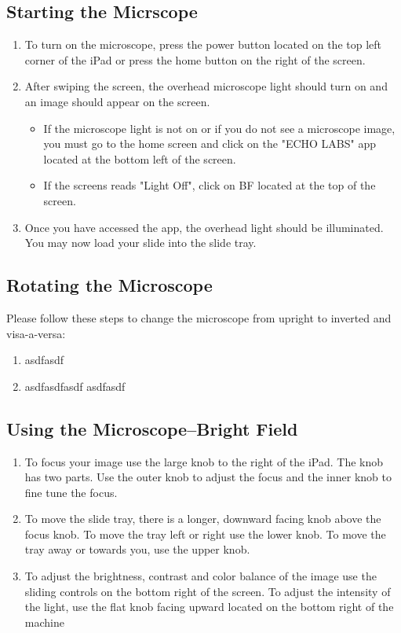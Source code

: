 \documentclass{article}
\begin{document}
\subsection{Starting the Micrscope}

\begin{enumerate}
  \item To turn on the microscope, press the power button located on the top left corner of the iPad or press the home button on the right of the screen.
  \item After swiping the screen, the overhead microscope light should turn on and an image should appear on the screen.
  
\begin{itemize}
  \item If the microscope light is not on or if you do not see a microscope image, you must go to the home screen and click on the "ECHO LABS" app located at the bottom left of the screen.
  \item If the screens reads "Light Off", click on BF located at the top of the screen.
\end{itemize}

  \item Once you have accessed the app, the overhead light should be illuminated. You may now load your slide into the slide tray.
\end{enumerate} 
  
  
\subsection{Rotating the Microscope}

Please follow these steps to change the microscope from upright to inverted and visa-a-versa:

\begin{enumerate}
  \item asdfasdf
  \item asdfasdfasdf asdfasdf
\end{enumerate}

\subsection{Using the Microscope--Bright Field} 

\begin{enumerate}
  \item To focus your image use the large knob to the right of the iPad. The knob has two parts. Use the outer knob to adjust the focus and the inner knob to fine tune the focus.
  \item To move the slide tray, there is a longer, downward facing knob above the focus knob. To move the tray left or right use the lower knob. To move the tray away or towards you, use the upper knob.
  \item To adjust the brightness, contrast and color balance of the image use the sliding controls on the bottom right of the screen. To adjust the intensity of the light, use the flat knob facing upward located on the bottom right of the machine
  
\end{enumerate}
\end{document}
